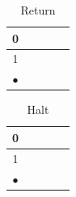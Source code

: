 \documentclass[]{article}
\begin{document}
\begin{table}[H]
	\begin{center}
		\caption{Return}\label{table:return}
		\begin{tabular}{|c|c||c|c|c|} \hline
			0&&&& \\ \hline
			1&&&& \\ \hline
			$\bullet$ &&&& \\ \hline
		\end{tabular}
	\end{center}
\end{table}

\begin{table}[H]
	\begin{center}
		\caption{Halt}\label{table:halt}
		\begin{tabular}{|c|c||c|c|c|} \hline
			0&&&& \\ \hline
			1&&&& \\ \hline
			$\bullet$ &&&& \\ \hline
		\end{tabular}
	\end{center}
\end{table}



\raggedright
{}

\end{document}
